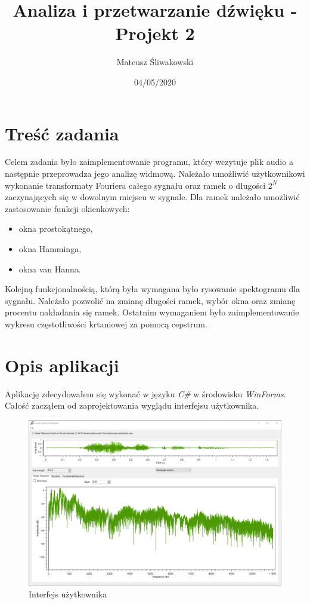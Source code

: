\documentclass{article}
\title{Analiza i przetwarzanie dźwięku - Projekt 2}
\date{04/05/2020}
\author{Mateusz Śliwakowski}
\begin{document}
  \maketitle
  
\section{Treść zadania}
Celem zadania było zaimplementowanie programu, który wczytuje plik audio a następnie przeprowadza jego analizę widmową. Należało umożliwić użytkownikowi wykonanie transformaty Fouriera całego sygnału oraz ramek o długości $2^N$ zaczynających się w dowolnym miejscu w sygnale. Dla ramek należało umożliwić zastosowanie funkcji okienkowych:
\begin{itemize}
\item okna prostokątnego,
\item okna Hamminga,
\item okna van Hanna.
\end{itemize}
Kolejną funkcjonalnością, którą była wymagana było rysowanie spektogramu dla sygnału. Należało pozwolić na zmianę długości ramek, wybór okna oraz zmianę procentu nakładania się ramek. Ostatnim wymaganiem było zaimplementowanie wykresu częstotliwości krtaniowej za pomocą cepstrum.

\section{Opis aplikacji}

Aplikację zdecydowałem się wykonać w języku \textit{C\#} w środowisku \textit{WinForms}. Całość zacząłem od zaprojektowania wyglądu interfejsu użytkownika.

\begin{figure}[H]
\includegraphics[width=\textwidth]{scr1.png}
\caption{Interfejs użytkownika}
\label{fig:interface}
\end{figure}
\end{document}
